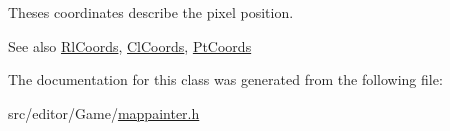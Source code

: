 Theses coordinates describe the pixel position.

\begin{DoxySeeAlso}{See also}
\hyperlink{class_rl_coords}{Rl\+Coords}, \hyperlink{class_cl_coords}{Cl\+Coords}, \hyperlink{class_pt_coords}{Pt\+Coords} 
\end{DoxySeeAlso}


The documentation for this class was generated from the following file\+:\begin{DoxyCompactItemize}
\item 
src/editor/\+Game/\hyperlink{mappainter_8h}{mappainter.\+h}\end{DoxyCompactItemize}
